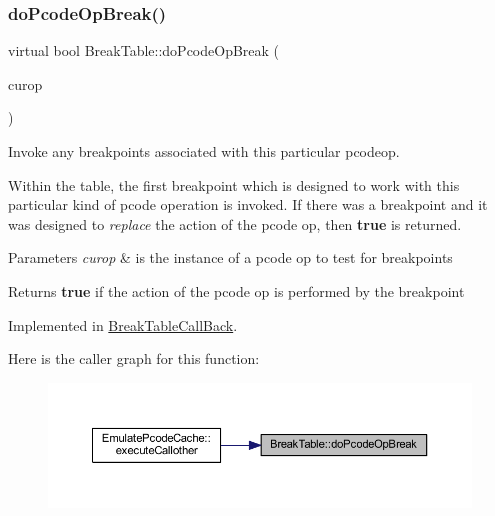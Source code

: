 \subsubsection{\texorpdfstring{doPcodeOpBreak()}{doPcodeOpBreak()}}
{\footnotesize\ttfamily virtual bool Break\+Table\+::do\+Pcode\+Op\+Break (\begin{DoxyParamCaption}\item[{\mbox{\hyperlink{class_pcode_op_raw}{Pcode\+Op\+Raw}} $\ast$}]{curop }\end{DoxyParamCaption})\hspace{0.3cm}{\ttfamily [pure virtual]}}



Invoke any breakpoints associated with this particular pcodeop. 

Within the table, the first breakpoint which is designed to work with this particular kind of pcode operation is invoked. If there was a breakpoint and it was designed to {\itshape replace} the action of the pcode op, then {\bfseries{true}} is returned. 
\begin{DoxyParams}{Parameters}
{\em curop} & is the instance of a pcode op to test for breakpoints \\
\hline
\end{DoxyParams}
\begin{DoxyReturn}{Returns}
{\bfseries{true}} if the action of the pcode op is performed by the breakpoint 
\end{DoxyReturn}


Implemented in \mbox{\hyperlink{class_break_table_call_back_a16b989de8c0b55d15940ac41bf7cdd73}{Break\+Table\+Call\+Back}}.

Here is the caller graph for this function\+:
\nopagebreak
\begin{figure}[H]
\begin{center}
\leavevmode
\includegraphics[width=350pt]{class_break_table_af8829327f29c768f834825fe40b54bad_icgraph}
\end{center}
\end{figure}
\mbox{\label{class_break_table_a7efdfc549d576cf17235aa74bbf19a79}} 
